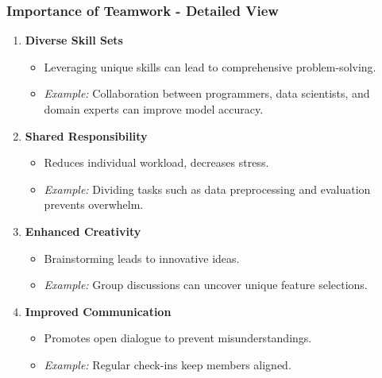 \documentclass[aspectratio=169]{beamer}
\begin{document}
\begin{frame}[fragile]
    \frametitle{Importance of Teamwork - Detailed View}
    \begin{enumerate}
        \item \textbf{Diverse Skill Sets}
            \begin{itemize}
                \item Leveraging unique skills can lead to comprehensive problem-solving.
                \item \textit{Example:} Collaboration between programmers, data scientists, and domain experts can improve model accuracy.
            \end{itemize}
        
        \item \textbf{Shared Responsibility}
            \begin{itemize}
                \item Reduces individual workload, decreases stress.
                \item \textit{Example:} Dividing tasks such as data preprocessing and evaluation prevents overwhelm.
            \end{itemize}
        
        \item \textbf{Enhanced Creativity}
            \begin{itemize}
                \item Brainstorming leads to innovative ideas.
                \item \textit{Example:} Group discussions can uncover unique feature selections.
            \end{itemize}
        
        \item \textbf{Improved Communication}
            \begin{itemize}
                \item Promotes open dialogue to prevent misunderstandings.
                \item \textit{Example:} Regular check-ins keep members aligned.
            \end{itemize}
    \end{enumerate}
\end{frame}
\end{document}
